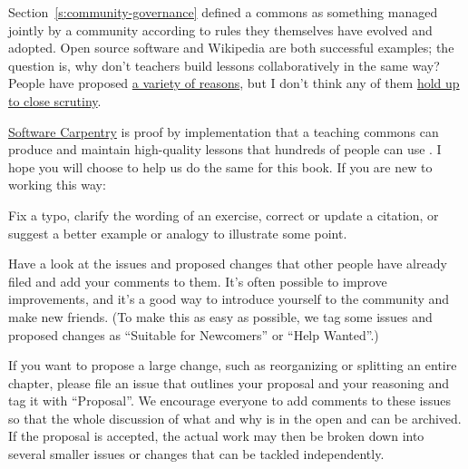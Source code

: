 Section~\ref{s:community-governance} defined a commons as something
managed jointly by a community according to rules they themselves have
evolved and adopted. Open source software and Wikipedia are both
successful examples; the question is, why don't teachers build lessons
collaboratively in the same way? People have proposed \href{http://blog.mrmeyer.com/2016/why-secondary-teachers-dont-want-a-github-for-lesson-plans/}{a variety of
reasons}, but I don't think any of them \href{http://third-bit.com/2016/04/29/why-teachers-dont-collaborate.html}{hold up to
close scrutiny}.

\href{http://software-carpentry.org}{Software Carpentry} is proof by implementation that a teaching
commons can produce and maintain high-quality lessons that hundreds of
people can use \cite{Wils2016}. I hope you will choose to help us
do the same for this book. If you are new to working this way:

\begin{description}
\tightlist
\item[Start small.]
Fix a typo, clarify the wording of an exercise, correct or update a
citation, or suggest a better example or analogy to illustrate some
point.
\item[Join the conversation.]
Have a look at the issues and proposed changes that other people
have already filed and add your comments to them. It's often
possible to improve improvements, and it's a good way to introduce
yourself to the community and make new friends. (To make this as
easy as possible, we tag some issues and proposed changes as
``Suitable for Newcomers'' or ``Help Wanted''.)
\item[Discuss, then edit.]
If you want to propose a large change, such as reorganizing or
splitting an entire chapter, please file an issue that outlines your
proposal and your reasoning and tag it with ``Proposal''. We encourage
everyone to add comments to these issues so that the whole
discussion of what and why is in the open and can be archived. If
the proposal is accepted, the actual work may then be broken down
into several smaller issues or changes that can be tackled
independently.
\end{description}

